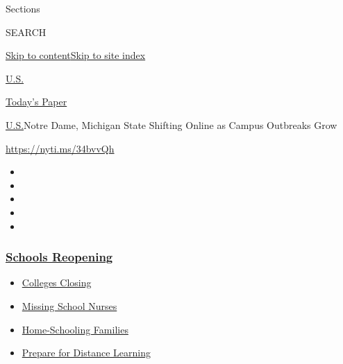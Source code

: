 Sections

SEARCH

\protect\hyperlink{site-content}{Skip to
content}\protect\hyperlink{site-index}{Skip to site index}

\href{https://www.nytimes3xbfgragh.onion/section/us}{U.S.}

\href{https://myaccount.nytimes3xbfgragh.onion/auth/login?response_type=cookie\&client_id=vi}{}

\href{https://www.nytimes3xbfgragh.onion/section/todayspaper}{Today's
Paper}

\href{/section/us}{U.S.}\textbar{}Notre Dame, Michigan State Shifting
Online as Campus Outbreaks Grow

\url{https://nyti.ms/34bvvQh}

\begin{itemize}
\item
\item
\item
\item
\item
\end{itemize}

\hypertarget{schools-reopening}{%
\subsubsection{\texorpdfstring{\href{https://www.nytimes3xbfgragh.onion/spotlight/schools-reopening?name=styln-coronavirus-schools-reopening\&region=TOP_BANNER\&variant=undefined\&block=storyline_menu_recirc\&action=click\&pgtype=Article\&impression_id=d629d1e0-e382-11ea-ae48-c9141959576c}{Schools
Reopening}}{Schools Reopening}}\label{schools-reopening}}

\begin{itemize}
\tightlist
\item
  \href{https://www.nytimes3xbfgragh.onion/2020/08/19/us/colleges-closing-covid.html?name=styln-coronavirus-schools-reopening\&region=TOP_BANNER\&variant=undefined\&block=storyline_menu_recirc\&action=click\&pgtype=Article\&impression_id=d629d1e1-e382-11ea-ae48-c9141959576c}{Colleges
  Closing}
\item
  \href{https://www.nytimes3xbfgragh.onion/2020/08/20/us/schools-reopening-nurses-covid.html?name=styln-coronavirus-schools-reopening\&region=TOP_BANNER\&variant=undefined\&block=storyline_menu_recirc\&action=click\&pgtype=Article\&impression_id=d629d1e2-e382-11ea-ae48-c9141959576c}{Missing
  School Nurses}
\item
  \href{https://www.nytimes3xbfgragh.onion/2020/08/18/parenting/homeschool-families.html?name=styln-coronavirus-schools-reopening\&region=TOP_BANNER\&variant=undefined\&block=storyline_menu_recirc\&action=click\&pgtype=Article\&impression_id=d629d1e3-e382-11ea-ae48-c9141959576c}{Home-Schooling
  Families}
\item
  \href{https://www.nytimes3xbfgragh.onion/2020/08/05/parenting/parents-distance-learning.html?name=styln-coronavirus-schools-reopening\&region=TOP_BANNER\&variant=undefined\&block=storyline_menu_recirc\&action=click\&pgtype=Article\&impression_id=d629d1e4-e382-11ea-ae48-c9141959576c}{Prepare
  for Distance Learning}
\end{itemize}

